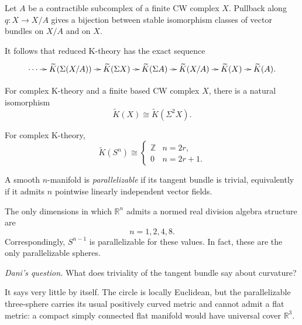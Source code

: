 \begin{lemma}
\label{at-lemma-contractible-bundle-quotient}
Let $A$ be a contractible subcomplex of a
finite CW complex $X$.  Pullback along
$q:X\longrightarrow X/A$ gives a bijection
between stable isomorphism classes of vector
bundles on $X/A$ and on $X$.
\end{lemma}

It follows that reduced K-theory has the
exact
sequence
$$
\xymatrix@C=8pt{
\cdots\ar[r]&
\widetilde K(\Sigma(X/A))\ar[r]&
\widetilde K(\Sigma X)\ar[r]&
\widetilde K(\Sigma A)\ar[r]&
\widetilde K(X/A)\ar[r]&
\widetilde K(X)\ar[r]&
\widetilde K(A).
}
$$

\begin{theorem}
\label{at-theorem-bott-periodicity}
For complex K-theory and a finite based CW
complex $X$, there is a natural isomorphism
$$
\widetilde K(X)
\cong\widetilde K(\Sigma^2X).
$$
\end{theorem}

\begin{corollary}
\label{at-lemma-k-theory-spheres}
For complex K-theory,
$$
\widetilde K(S^n)\cong
\begin{cases}
\mathbb{Z}&n=2r,\\
0&n=2r+1.
\end{cases}
$$
\end{corollary}

\begin{definition}
\label{at-definition-parallelizable-sphere}
A smooth $n$-manifold is
\emph{parallelizable} if its tangent bundle
is trivial, equivalently if it admits $n$
pointwise linearly independent vector fields.
\end{definition}

\begin{theorem}
\label{at-theorem-division-algebra-spheres}
The only dimensions in which
$\mathbb{R}^n$ admits a normed real division
algebra structure are
$$
n=1,2,4,8.
$$
Correspondingly, $S^{n-1}$ is parallelizable
for these values.  In fact, these are the
only parallelizable spheres.
\end{theorem}

\emph{Dani's question.}
What does triviality of the tangent bundle
say about curvature?

It says very little by itself.  The circle is
locally Euclidean, but the parallelizable
three-sphere carries its usual positively
curved metric and cannot admit a flat metric:
a compact simply connected flat manifold
would have universal cover $\mathbb{R}^3$.

